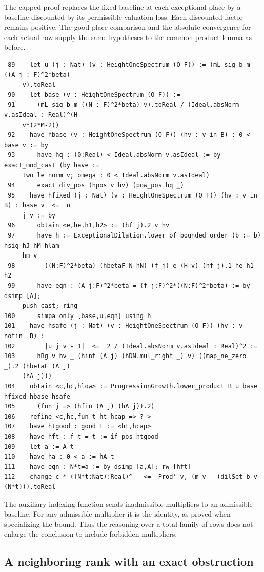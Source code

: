 \documentclass[12pt,letterpaper]{article}
\begin{document}
The capped proof replaces the fixed baseline at each exceptional place by a baseline discounted by its permissible valuation loss. Each discounted factor remains positive. The good-place comparison and the absolute convergence for each actual row supply the same hypotheses to the common product lemma as before.
\par
{\fontsize{9.2}{11.2}\selectfont\begin{verbatim}
 89    let u (j : Nat) (v : HeightOneSpectrum (O F)) := (mL sig b m ((A j : F)^2*beta)
     v).toReal
 90    let base (v : HeightOneSpectrum (O F)) :=
 91      (mL sig b m ((N : F)^2*beta) v).toReal / (Ideal.absNorm v.asIdeal : Real)^(H
     v*(2*M-2))
 92    have hbase (v : HeightOneSpectrum (O F)) (hv : v in B) : 0 < base v := by
 93      have hq : (0:Real) < Ideal.absNorm v.asIdeal := by exact_mod_cast (by have :=
     two_le_norm v; omega : 0 < Ideal.absNorm v.asIdeal)
 94      exact div_pos (hpos v hv) (pow_pos hq _)
 95    have hfixed (j : Nat) (v : HeightOneSpectrum (O F)) (hv : v in B) : base v  <=  u
     j v := by
 96      obtain <e,he,h1,h2> := (hf j).2 v hv
 97      have h := ExceptionalDilation.lower_of_bounded_order (b := b) hsig hJ hM hlam
     hm v
 98        ((N:F)^2*beta) (hbetaF N hN) (f j) e (H v) (hf j).1 he h1 h2
 99      have eqn : (A j:F)^2*beta = (f j:F)^2*((N:F)^2*beta) := by dsimp [A];
     push_cast; ring
100      simpa only [base,u,eqn] using h
101    have hsafe (j : Nat) (v : HeightOneSpectrum (O F)) (hv : v  notin  B) :
102        |u j v - 1|  <=  2 / (Ideal.absNorm v.asIdeal : Real)^2 :=
103      hBg v hv _ (hint (A j) (hDN.mul_right _) v) ((map_ne_zero _).2 (hbetaF (A j)
     (hA j)))
104    obtain <c,hc,hlow> := ProgressionGrowth.lower_product B u base hfixed hbase hsafe
105      (fun j => (hfin (A j) (hA j)).2)
106    refine <c,hc,fun t ht hcap => ?_>
107    have htgood : good t := <ht,hcap>
108    have hft : f t = t := if_pos htgood
109    let a := A t
110    have ha : 0 < a := hA t
111    have eqn : N*t=a := by dsimp [a,A]; rw [hft]
112    change c * ((N*t:Nat):Real)^_  <=  Prod' v, (m v _ (dilSet b v (N*t))).toReal
\end{verbatim}}
The auxiliary indexing function sends inadmissible multipliers to an admissible baseline. For any admissible multiplier it is the identity, as proved when specializing the bound. Thus the reasoning over a total family of rows does not enlarge the conclusion to include forbidden multipliers.
\clearpage{}\subsection*{A neighboring rank with an exact obstruction}\label{extract-FourSquareControl234}
\end{document}
